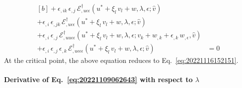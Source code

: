 \documentclass[12pt, final]{scrartcl}
\theoremstyle{definition}
\newcommand{\E}{\mathcal E}
\newcommand{\EE}{\mathcal E ^ \dagger}
\begin{document}
\begin{equation}
\begin{aligned}[b]
    + \epsilon_{,ik} \, \epsilon_{,j} \, \EE_{,u\epsilon\epsilon}(u^\ast + \xi_l \, v_l + w, \lambda, \epsilon; \hat{v}) &\\
    + \epsilon_{,i} \, \epsilon_{,jk} \, \EE_{,u\epsilon\epsilon}(u^\ast + \xi_l \, v_l + w, \lambda, \epsilon; \hat{v}) &\\
    + \epsilon_{,i} \, \epsilon_{,j} \, \EE_{,uu\epsilon\epsilon}(u^\ast + \xi_l \, v_l + w, \lambda, \epsilon;  v_k + w_{,k} + \epsilon_{,k} \, w_{,\epsilon}, \hat{v}) &\\
    + \epsilon_{,i} \, \epsilon_{,j} \, \epsilon_{,k} \, \EE_{,u\epsilon\epsilon\epsilon}(u^\ast + \xi_l \, v_l + w, \lambda, \epsilon; \hat{v}) &= 0
  \end{aligned}
\end{equation}
At the critical point, the above equation reduces to Eq.~\eqref{eq:20221116152151}.

\paragraph{Derivative of Eq.~\eqref{eq:20221109062643} with respect to \(\lambda\)}
\end{document}
